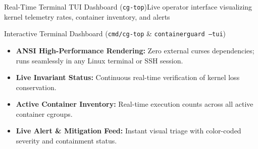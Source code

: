 \documentclass[aspectratio=169,10pt]{beamer}
\begin{document}
\begin{frame}{Real-Time Terminal TUI Dashboard (\texttt{cg-top})}{Live operator interface visualizing kernel telemetry rates, container inventory, and alerts}
  \begin{block}{Interactive Terminal Dashboard (\texttt{cmd/cg-top} \& \texttt{containerguard --tui})}
    \scriptsize
    \begin{itemize}
      \item \textbf{ANSI High-Performance Rendering:} Zero external curses dependencies; runs seamlessly in any Linux terminal or SSH session.
      \item \textbf{Live Invariant Status:} Continuous real-time verification of kernel loss conservation.
      \item \textbf{Active Container Inventory:} Real-time execution counts across all active container cgroups.
      \item \textbf{Live Alert \& Mitigation Feed:} Instant visual triage with color-coded severity and containment status.
    \end{itemize}
  \end{block}


\end{frame}
\end{document}

